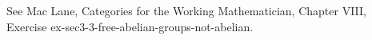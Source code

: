 See Mac Lane, Categories for the Working Mathematician, Chapter VIII, Exercise ex-sec3-3-free-abelian-groups-not-abelian.

